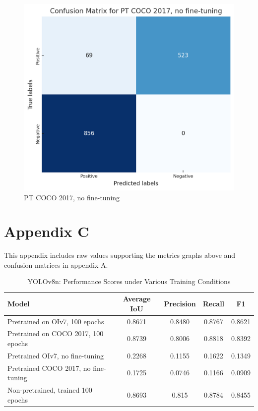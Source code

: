 \documentclass[10pt,twocolumn,letterpaper]{article}
\begin{document}
\begin{figure}[H]
    \centering
    \includegraphics[width=0.8\linewidth]{cmptcoconft.png}
    \caption{PT COCO 2017, no fine-tuning}
    \label{fig:cmptcoconft}
\end{figure}

\onecolumn

\section{Appendix C}
This appendix includes raw values supporting the metrics graphs above and confusion matrices in appendix A.

\begin{table}[H]
\centering
\caption{YOLOv8n: Performance Scores under Various Training Conditions}
\label{tab:performance_scores}
\begin{tabular}{|l|c|c|c|c|}
\hline
\textbf{Model} & \textbf{Average IoU} & \textbf{Precision} & \textbf{Recall} & \textbf{F1} \\ \hline
Pretrained on OIv7, 100 epochs & 0.8671 & 0.8480 & 0.8767 & 0.8621 \\ \hline
Pretrained on COCO 2017, 100 epochs & 0.8739 & 0.8006 & 0.8818 & 0.8392 \\ \hline
Pretrained OIv7, no fine-tuning & 0.2268 & 0.1155 & 0.1622 & 0.1349 \\ \hline
Pretrained COCO 2017, no fine-tuning & 0.1725 & 0.0746 & 0.1166 & 0.0909 \\ \hline
Non-pretrained, trained 100 epochs & 0.8693 & 0.815 & 0.8784 & 0.8455 \\ \hline
\end{tabular}
\end{table}
\end{document}
